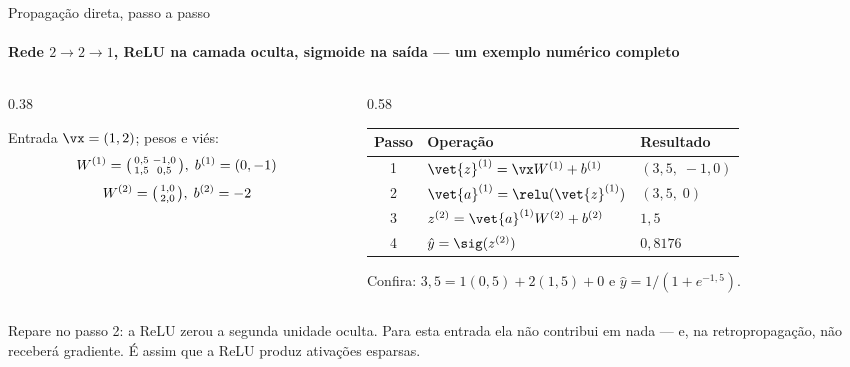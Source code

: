 \documentclass[aspectratio=169, 11pt]{beamer}
\begin{document}
\begin{frame}{Propagação direta, passo a passo}
  \framesubtitle{Rede $2{\to}2{\to}1$, ReLU na camada oculta, sigmoide na saída — um exemplo numérico completo}

  \begin{columns}[T]
    \begin{column}{0.38\textwidth}
      \begin{center}
      \end{center}
      \small Entrada \(\vx = (1, 2)\); pesos e viés:
      \[
        W^{(1)} = \begin{psmallmatrix} 0{,}5 & -1{,}0\\ 1{,}5 & 0{,}5 \end{psmallmatrix},\;
        b^{(1)} = (0, -1)
      \]
      \[
        W^{(2)} = \begin{psmallmatrix} 1{,}0\\ 2{,}0 \end{psmallmatrix},\;
        b^{(2)} = -2
      \]
    \end{column}
    \begin{column}{0.58\textwidth}
      \begin{center}\footnotesize
      \begin{tabular}{@{}cll@{}}
        \toprule
        \textbf{Passo} & \textbf{Operação} & \textbf{Resultado}\\
        \midrule
        1 & \(\vet{z}^{(1)} = \vx W^{(1)} + b^{(1)}\) & \((3{,}5,\; -1{,}0)\)\\
        2 & \(\vet{a}^{(1)} = \relu(\vet{z}^{(1)})\) & \((3{,}5,\; 0)\)\\
        3 & \(z^{(2)} = \vet{a}^{(1)} W^{(2)} + b^{(2)}\) & \(1{,}5\)\\
        4 & \(\hat{y} = \sig(z^{(2)})\) & \(0{,}8176\)\\
        \bottomrule
      \end{tabular}
      \end{center}
      \small Confira: \(3{,}5 = 1(0{,}5) + 2(1{,}5) + 0\) e
      \(\hat y = 1/(1 + e^{-1{,}5})\).
    \end{column}
  \end{columns}

  \begin{alertabox}
    Repare no passo 2: a ReLU zerou a segunda unidade oculta. Para esta
    entrada ela não contribui em nada — e, na retropropagação, não receberá
    gradiente. É assim que a ReLU produz \alert{ativações esparsas}.
  \end{alertabox}
\end{frame}
\end{document}
